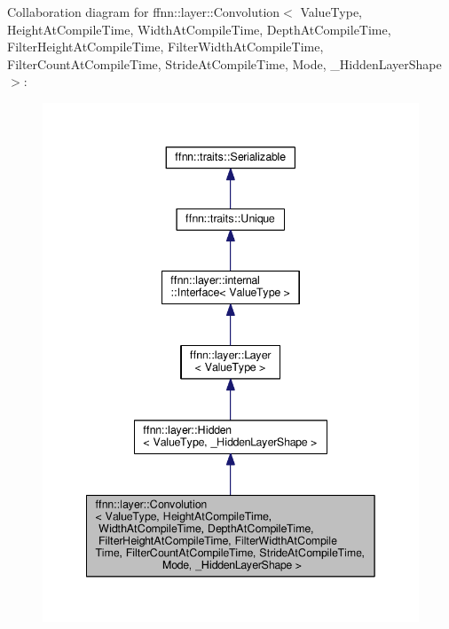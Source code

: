 Collaboration diagram for ffnn\-:\-:layer\-:\-:Convolution$<$ Value\-Type, Height\-At\-Compile\-Time, Width\-At\-Compile\-Time, Depth\-At\-Compile\-Time, Filter\-Height\-At\-Compile\-Time, Filter\-Width\-At\-Compile\-Time, Filter\-Count\-At\-Compile\-Time, Stride\-At\-Compile\-Time, Mode, \-\_\-\-Hidden\-Layer\-Shape $>$\-:\nopagebreak
\begin{figure}[H]
\begin{center}
\leavevmode
\includegraphics[width=342pt]{classffnn_1_1layer_1_1_convolution__coll__graph}
\end{center}
\end{figure}
